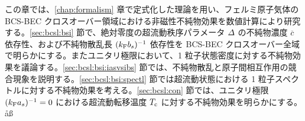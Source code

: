 \label{chap:bcsl}

この章では、\ref{chap:formalism} 章で定式化した理論を用い、フェルミ原子気体の BCS-BEC クロスオーバー領域における非磁性不純物効果を数値計算により研究する。\ref{sec:bcsl:bsi} 節で、絶対零度の超流動秩序パラメータ $\varDelta$ の不純物濃度 $\overline{c}$ 依存性、および不純物散乱長 $(k_{\text{F}} b_s)^{-1}$ 依存性を BCS-BEC クロスオーバー全域で明らかにする。またユニタリ極限において、1 粒子状態密度に対する不純物効果を議論する。\ref{sec:bcsl:bsi:iasvsibs} 節では、不純物散乱と原子間相互作用の競合現象を説明する。\ref{sec:bcsl:bsi:spectl} 節では超流動状態における 1 粒子スペクトルに対する不純物効果を考える。\ref{sec:bcsl:con} 節では、ユニタリ極限 $(k_{\text{F}} a_s)^{-1}=0$ における超流動転移温度 $T_{\text{c}}$ に対する不純物効果を明らかにする。
åß



